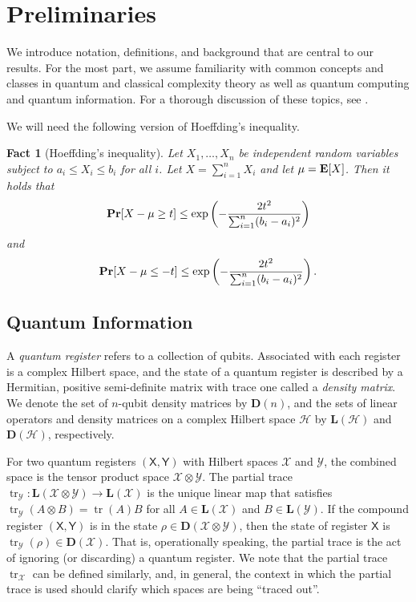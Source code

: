 \documentclass[11pt]{article}
\newtheorem{fact}[theorem]{Fact}
\theoremstyle{definition}
\renewcommand{\Pr}{\mathop{\bf Pr\/}}
\newcommand{\E}{\mathop{\bf E\/}}
\DeclareMathOperator{\tr}{tr}
\newcommand{\calH}{\mathcal{H}}
\newcommand{\calX}{\mathcal{X}}
\newcommand{\calY}{\mathcal{Y}}
\newcommand{\qreg}[1]{\mathsf{#1}}
\begin{document}
\section{Preliminaries}\label{sec:prelims}

We introduce notation, definitions, and background that are central to our results. 
For the most part, we assume familiarity with common concepts and classes in quantum and classical complexity theory as well as quantum computing and quantum information.
For a thorough discussion of these topics, see \cite{arora2009computational, watrous2018theory, kitaev2002classical, nielsen2002quantum}. 

We will need the following version of Hoeffding's inequality. 

\begin{fact}[Hoeffding’s inequality]\label{fact:hoeffding}
Let $X_1,\dots, X_n$ be independent random variables subject to $a_i \le X_i \le b_i$ for all $i$. 
Let $X = \sum_{i=1}^n X_i$ and let $\mu = \E[X]$. 
Then it holds that
\[
\Pr[X - \mu \geq t] \le \exp\left(- \frac{2t^2}{\sum_{i=1}^n (b_i - a_i)^2} \right)
\]
and 
\[
\Pr[X - \mu \leq -t] \le \exp\left(- \frac{2t^2}{\sum_{i=1}^n (b_i - a_i)^2} \right).
\]
\end{fact}

\subsection{Quantum Information}
A \textit{quantum register} refers to a collection of qubits. Associated with each register is a complex Hilbert space, and the state of a quantum register is described by a Hermitian, positive semi-definite matrix with trace one called a \textit{density matrix}.  
We denote the set of $n$-qubit density matrices by $\mathbf{D}(n)$, and the sets of linear operators and density matrices on a complex Hilbert space $\calH$ by $\mathbf{L}(\calH)$ and $\mathbf{D}(\calH)$, respectively. 

For two quantum registers $(\qreg{X}, \qreg{Y})$ with Hilbert spaces $\calX$ and $\calY$, the combined space is the tensor product space $\calX \otimes \calY$.   
The partial trace $\tr_{\calY}: \mathbf{L}(\calX \otimes \calY) \to \mathbf{L}(\calX)$ is the unique linear map that satisfies $\tr_\calY(A \otimes B) = \tr(A) B$ for all $A \in \mathbf{L}(\calX)$ and $B \in \mathbf{L}(\calY)$. 
If the compound register $(\qreg{X}, \qreg{Y})$ is in the state $\rho \in \mathbf{D}(\calX \otimes \calY)$, then the state of register $\qreg{X}$ is $\tr_\calY(\rho) \in \mathbf{D}(\calX)$.
That is, operationally speaking, the partial trace is the act of ignoring (or discarding) a quantum register.
We note that the partial trace $\tr_\calX$ can be defined similarly, and, in general, the context in which the partial trace is used should clarify which spaces are being ``traced out''.  
\end{document}
